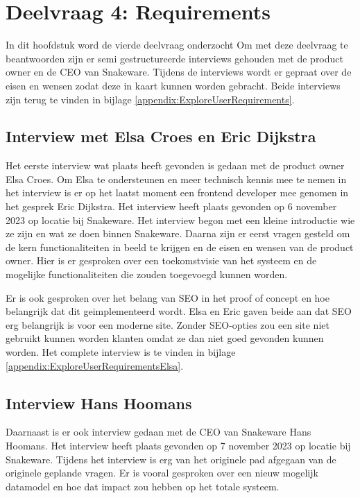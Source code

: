 \section{Deelvraag 4: Requirements}
\label{sec:Requirements}
In dit hoofdstuk word de vierde deelvraag onderzocht \textit{\SubquestionFour}
Om met deze deelvraag te beantwoorden zijn er semi gestructureerde interviews gehouden met de product owner en de CEO van Snakeware.
Tijdens de interviews wordt er gepraat over de eisen en wensen zodat deze in kaart kunnen worden gebracht.
Beide interviews zijn terug te vinden in bijlage \ref{appendix:ExploreUserRequirements}.

\subsection{Interview met Elsa Croes en Eric Dijkstra}
Het eerste interview wat plaats heeft gevonden is gedaan met de product owner Elsa Croes.
Om Elsa te ondersteunen en meer technisch kennis mee te nemen in het interview is er op het laatst moment een frontend developer mee genomen in het gesprek Eric Dijkstra.
Het interview heeft plaats gevonden op 6 november 2023 op locatie bij Snakeware.
Het interview begon met een kleine introductie wie ze zijn en wat ze doen binnen Snakeware.
Daarna zijn er eerst vragen gesteld om de kern functionaliteiten in beeld te krijgen en de eisen en wensen van de product owner.
Hier is er gesproken over een toekomstvisie van het systeem en de mogelijke functionaliteiten die zouden toegevoegd kunnen worden.

\whitespace
Er is ook gesproken over het belang van SEO in het proof of concept en hoe belangrijk dat dit geimplementeerd wordt.
Elsa en Eric gaven beide aan dat SEO erg belangrijk is voor een moderne site.
Zonder SEO-opties zou een site niet gebruikt kunnen worden klanten omdat ze dan niet goed gevonden kunnen worden.
Het complete interview is te vinden in bijlage \ref{appendix:ExploreUserRequirementsElsa}.

\subsection{Interview Hans Hoomans}
Daarnaast is er ook interview gedaan met de CEO van Snakeware Hans Hoomans.
Het interview heeft plaats gevonden op 7 november 2023 op locatie bij Snakeware.
Tijdens het interview is erg van het originele pad afgegaan van de originele geplande vragen.
Er is vooral gesproken over een nieuw mogelijk datamodel en hoe dat impact zou hebben op het totale systeem.

